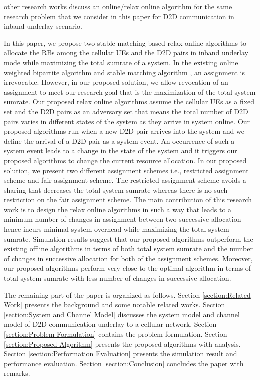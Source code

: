 \documentclass[times]{dacauth}
\begin{document}
other research works discuss an online/relax online algorithm for the same research problem that we consider in this paper for D2D communication in inband underlay scenario.

\smallskip 
\noindent
In this paper, we propose two stable matching \cite{knuth1976mariages} based relax online algorithms to allocate the RBs among the cellular UEs and the D2D pairs in inband underlay mode while maximizing the total sumrate of a system. In the existing online   weighted bipartite algorithm \cite{karp1990optimal} and stable matching algorithm \cite{khuller1994line}, an assignment is irrevocable. However, in our proposed solution, we allow revocation of an assignment to meet our research goal that is the maximization of the total system sumrate. Our proposed relax online algorithms assume the cellular UEs as a fixed set and the D2D pairs as an adversary set that means the total number of D2D pairs varies in different states of the system as they arrive in system online. Our proposed algorithms run when a new D2D pair arrives into the system and we define the arrival of a D2D pair as a system event. An occurrence of such a system event leads to a change in the state of the system and it triggers our proposed algorithms to change the current resource allocation. In our proposed solution, we present two different assignment schemes i.e., restricted assignment scheme and fair assignment scheme. The restricted assignment scheme avoids a sharing that decreases the total system sumrate whereas there is no such restriction on the fair assignment scheme. The main contribution of this research work is to design the relax online algorithms in such a way that leads to a minimum number of changes in assignment between two successive allocation hence incurs minimal system overhead while maximizing the total system sumrate. Simulation results suggest that our proposed algorithms outperform the existing offline algorithms in terms of both total system sumrate and the number of changes in successive allocation for both of the assignment schemes. Moreover, our proposed algorithms perform very close to the optimal algorithm \cite{hungarian} in terms of total system sumrate with less number of changes in successive allocation.

\smallskip 
\noindent
The remaining part of the paper is organized as follows. Section \ref{section:Related Work} presents the background and some notable related works. Section \ref{section:System and Channel Model} discusses the system model and channel model of D2D communication underlay to a cellular network. Section \ref{section:Problem Formulation} contains the problem formulation. Section \ref{section:Proposed Algorithm} presents the proposed algorithms with analysis. Section \ref{section:Performation Evaluation} presents the simulation result and performance evaluation. Section \ref{section:Conclusion} concludes the paper with remarks.
\vspace{-0.3cm}
\end{document}

